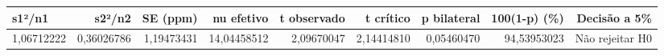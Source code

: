 \begin{tabular}{lrrrrrrrr}
\toprule
s1²/n1 & s2²/n2 & SE (ppm) & nu efetivo & t observado & t crítico & p bilateral & 100(1-p) (\%) & Decisão a 5\% \\
\midrule
1,06712222 & 0,36026786 & 1,19473431 & 14,04458512 & 2,09670047 & 2,14414810 & 0,05460470 & 94,53953023 & Não rejeitar H0 \\
\bottomrule
\end{tabular}
